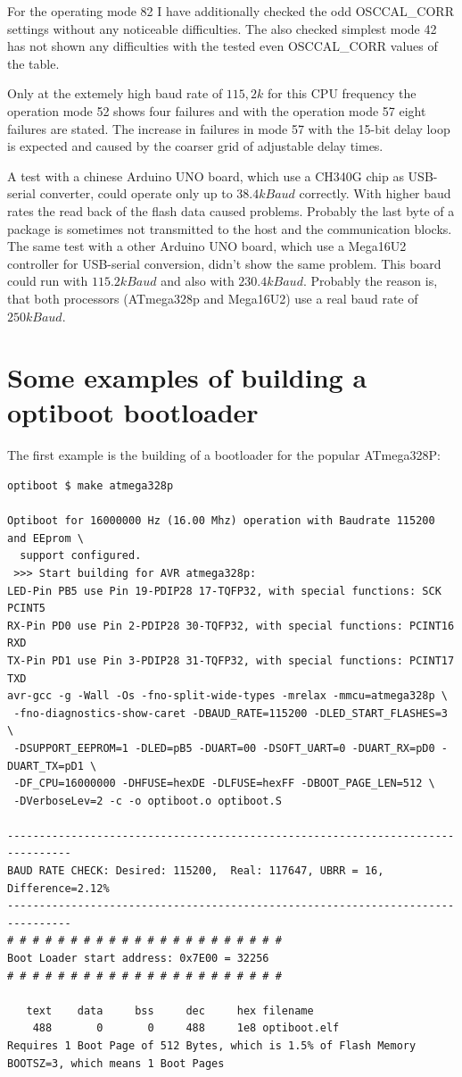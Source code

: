For the operating mode 82 I have additionally checked the odd OSCCAL\_CORR settings without
any noticeable difficulties. The also checked simplest mode 42 has not shown
any difficulties with the tested even OSCCAL\_CORR values of the table.

Only at the extemely high baud rate of \(115,2k\) for this CPU frequency the operation
mode 52 shows four failures and with the operation mode 57 eight failures are stated.
The increase in failures in mode 57 with the 15-bit delay loop is expected and caused by
the coarser grid of adjustable delay times.

A test with a chinese Arduino UNO board, which use a CH340G chip as USB-serial converter,
could operate only up to \(38.4kBaud\) correctly.
With higher baud rates the read back of the flash data caused problems.
Probably the last byte of a package is sometimes not transmitted to the host and
the communication blocks.
The same test with a other Arduino UNO board, which use a Mega16U2 controller
for USB-serial conversion, didn't show the same problem.
This board could run with \(115.2kBaud\) and also with \(230.4kBaud\). 
Probably the reason is, that both processors (ATmega328p and Mega16U2)
use a real baud rate of \(250kBaud\).


\section{Some examples of building a optiboot bootloader}

The first example is the building of a bootloader for the popular ATmega328P:

\begin{verbatim}
optiboot $ make atmega328p

Optiboot for 16000000 Hz (16.00 Mhz) operation with Baudrate 115200 and EEprom \
  support configured.
 >>> Start building for AVR atmega328p:
LED-Pin PB5 use Pin 19-PDIP28 17-TQFP32, with special functions: SCK PCINT5
RX-Pin PD0 use Pin 2-PDIP28 30-TQFP32, with special functions: PCINT16 RXD
TX-Pin PD1 use Pin 3-PDIP28 31-TQFP32, with special functions: PCINT17 TXD
avr-gcc -g -Wall -Os -fno-split-wide-types -mrelax -mmcu=atmega328p \
 -fno-diagnostics-show-caret -DBAUD_RATE=115200 -DLED_START_FLASHES=3 \
 -DSUPPORT_EEPROM=1 -DLED=pB5 -DUART=00 -DSOFT_UART=0 -DUART_RX=pD0 -DUART_TX=pD1 \
 -DF_CPU=16000000 -DHFUSE=hexDE -DLFUSE=hexFF -DBOOT_PAGE_LEN=512 \
 -DVerboseLev=2 -c -o optiboot.o optiboot.S

--------------------------------------------------------------------------------
BAUD RATE CHECK: Desired: 115200,  Real: 117647, UBRR = 16, Difference=2.12%
--------------------------------------------------------------------------------
# # # # # # # # # # # # # # # # # # # # # #
Boot Loader start address: 0x7E00 = 32256
# # # # # # # # # # # # # # # # # # # # # #

   text    data     bss     dec     hex filename
    488       0       0     488     1e8 optiboot.elf
Requires 1 Boot Page of 512 Bytes, which is 1.5% of Flash Memory
BOOTSZ=3, which means 1 Boot Pages

\end{verbatim}


